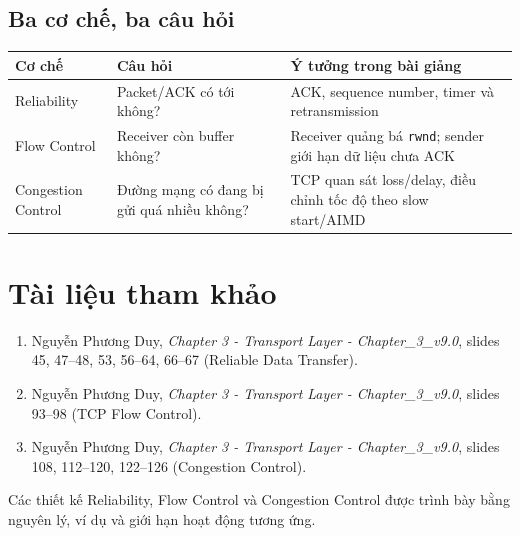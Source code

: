 \documentclass[11pt,a4paper]{article}
\begin{document}
\subsection{Ba cơ chế, ba câu hỏi}
\begin{tabularx}{\linewidth}{@{}P{3.2cm}Y Y@{}}
\toprule
\textbf{Cơ chế} & \textbf{Câu hỏi} & \textbf{Ý tưởng trong bài giảng} \\
\midrule
Reliability & Packet/ACK có tới không? & ACK, sequence number, timer và retransmission \\
Flow Control & Receiver còn buffer không? & Receiver quảng bá \texttt{rwnd}; sender giới hạn dữ liệu chưa ACK \\
Congestion Control & Đường mạng có đang bị gửi quá nhiều không? & TCP quan sát loss/delay, điều chỉnh tốc độ theo slow start/AIMD \\
\bottomrule
\end{tabularx}

\section{Tài liệu tham khảo}
\begin{enumerate}
  \item Nguyễn Phương Duy, \emph{Chapter 3 - Transport Layer - Chapter\_3\_v9.0}, slides 45, 47--48, 53, 56--64, 66--67 (Reliable Data Transfer).
  \item Nguyễn Phương Duy, \emph{Chapter 3 - Transport Layer - Chapter\_3\_v9.0}, slides 93--98 (TCP Flow Control).
  \item Nguyễn Phương Duy, \emph{Chapter 3 - Transport Layer - Chapter\_3\_v9.0}, slides 108, 112--120, 122--126 (Congestion Control).
\end{enumerate}
Các thiết kế Reliability, Flow Control và Congestion Control được trình bày bằng nguyên lý, ví dụ và giới hạn hoạt động tương ứng.
\end{document}
